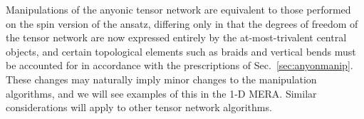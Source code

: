 \documentclass[aps,prb,reprint,superscriptaddress,amsfonts,amsmath,amssymb,showpacs,floatfix]{revtex4-1}
\newcommand{\fref}[1]{Fig.~\ref{#1}}
\newcommand{\sref}[1]{Sec.~\ref{#1}}
\newcommand{\p}[1]{\phantom{#1}}
\newcommand{\alphabeta}{_\alpha^{\p{\alpha}\beta}}
\begin{document}

%

Manipulations of the anyonic tensor network are equivalent to those performed on the spin version of the ansatz, differing only
in that the degrees of freedom of the tensor network are now expressed entirely by the at-most-trivalent central objects, and certain topological elements such as braids and vertical bends must be accounted for in accordance with the prescriptions of \sref{sec:anyonmanip}. 
These changes may naturally imply minor changes to the manipulation algorithms, and we will see examples of this in the {1-D} MERA. Similar considerations will %
apply %
to other tensor network algorithms. %



\end{document}
